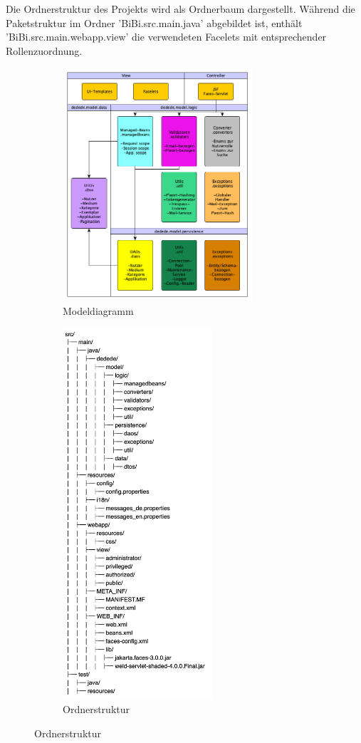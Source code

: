 \documentclass{article}
\begin{document}
Die Ordnerstruktur des Projekts wird als Ordnerbaum dargestellt.
Während die Paketstruktur im Ordner 'BiBi.src.main.java' abgebildet ist, enthält 'BiBi.src.main.webapp.view' die verwendeten Facelets mit entsprechender Rollenzuordnung. \vspace{0.5em}

\begin{figure}[ht]
	\centering
	\begin{subfigure}[b]{0.45\textwidth}
		\centering
		\includegraphics[width = 19em]{Modeldiagramm}
		\caption{Modeldiagramm}
	\end{subfigure}
	\hfill
	\begin{subfigure}[b]{0.45\textwidth}
		\centering
		\includegraphics[width = 15em]{FileStructure}
		\caption{Ordnerstruktur}
	\end{subfigure}
\end{figure}
\end{document}

